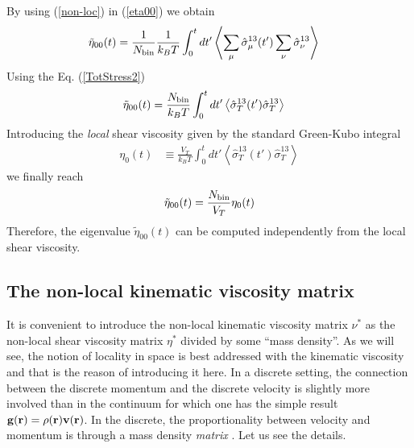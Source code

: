 \documentclass[a4paper,openright,12pt]{book}
\newcommand{\llangle}{\left\langle}
\newcommand{\rrangle}{\right\rangle}
\begin{document}
By using (\ref{non-loc}) in (\ref{eta00}) we obtain
\begin{align}
    \tilde{\eta}_{00}(t)&=\frac{1}{N_{\rm bin}}\frac{1}{k_BT}\int_0^tdt'\llangle \sum_{\mu}\hat{\sigma}^{13}_{\mu}(t')\sum_{\nu}\hat{\sigma}^{13}_{\nu}\rrangle
\end{align}
Using the Eq. (\ref{TotStress2})
\begin{align}
    \tilde{\eta}_{00}(t)&=\frac{N_{\rm bin}}{k_BT}\int_0^tdt'\llangle \hat{\sigma}^{13}_T(t')\hat{\sigma}^{13}_T\rrangle
\end{align}
Introducing the \textit{local}  shear viscosity given by the standard Green-Kubo
integral
\begin{align}
  \eta_0(t) &\equiv \frac{V_T}{k_BT}\int_0^t dt'\llangle \hat{\sigma}_T^{13}(t')\hat{\sigma}_T^{13}
\rrangle
\label{etat}
\end{align}
we finally reach 
\begin{align}
    \tilde{\eta}_{00}(t)=\frac{N_{\rm bin}}{V_T}\eta_0(t)
\end{align}
Therefore, the eigenvalue $\tilde{\eta}_{00}(t)$ can be computed independently from
the local shear viscosity.

\subsection{The non-local kinematic viscosity matrix}
It is convenient to introduce the non-local kinematic viscosity matrix
$\nu^*$ as  the non-local shear  viscosity matrix $\eta^*$  divided by
some ``mass density''. As we will see, the notion of locality in space
is best addressed with the kinematic  viscosity and that is the reason
of introducing it here. In  a discrete setting, the connection between
the  discrete momentum  and  the discrete  velocity  is slightly  more
involved than  in the continuum  for which  one has the  simple result
${\bf g}({\bf  r})=\rho({\bf r}){\bf  v}({\bf r})$.  In  the discrete,
the proportionality  between velocity and  momentum is through  a mass
density \textit{matrix} \cite{3}.  Let us see the details.
\end{document}
